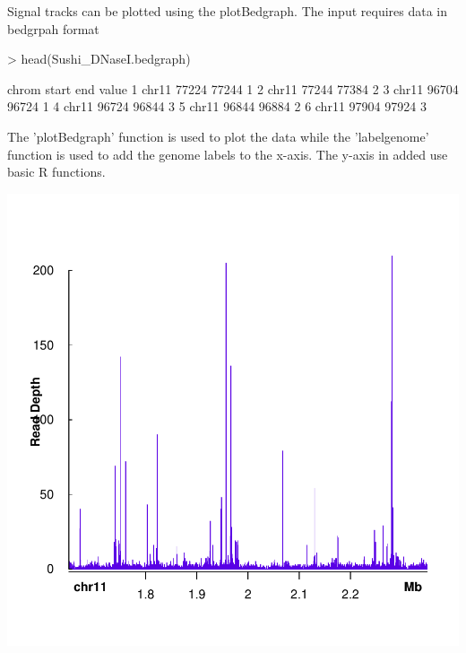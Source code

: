 \documentclass{article}
\begin{document}
Signal tracks can be plotted using the plotBedgraph.  The input requires data in bedgrpah format

\begin{Schunk}
\begin{Sinput}
> head(Sushi_DNaseI.bedgraph)
\end{Sinput}
\begin{Soutput}
  chrom start   end value
1 chr11 77224 77244     1
2 chr11 77244 77384     2
3 chr11 96704 96724     1
4 chr11 96724 96844     3
5 chr11 96844 96884     2
6 chr11 97904 97924     3
\end{Soutput}
\end{Schunk}

The 'plotBedgraph' function is used to plot the data while the 'labelgenome' function is used to add the genome labels to the x-axis.  The y-axis in added use basic R functions.

\begin{center}

\begin{Schunk}
\end{Schunk}
\includegraphics{Sushi-011}
\end{center}
\end{document}
